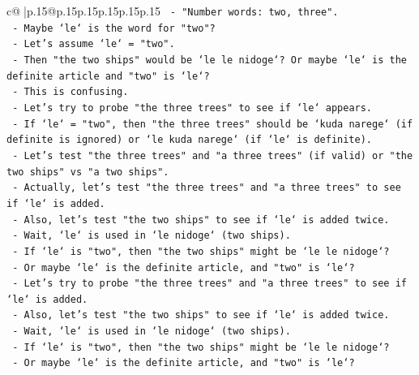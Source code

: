 \documentclass{article}
\begin{document}
{\begin{supertabular}{c@{$\;$}|p{.15\linewidth}@{}p{.15\linewidth}p{.15\linewidth}p{.15\linewidth}p{.15\linewidth}p{.15\linewidth}}
{{{\texttt{                           {-} "Number words: two, three".} \\
\texttt{                           {-} Maybe `le` is the word for "two"?} \\
\texttt{                           {-} Let's assume `le` = "two".} \\
\texttt{                           {-} Then "the two ships" would be `le le nidoge`? Or maybe `le` is the definite article and "two" is `le`?} \\
\texttt{                           {-} This is confusing.} \\
\texttt{                           {-} Let's try to probe "the three trees" to see if `le` appears.} \\
\texttt{                           {-} If `le` = "two", then "the three trees" should be `kuda narege` (if definite is ignored) or `le kuda narege` (if `le` is definite).} \\
\texttt{                           {-} Let's test "the three trees" and "a three trees" (if valid) or "the two ships" vs "a two ships".} \\
\texttt{                           {-} Actually, let's test "the three trees" and "a three trees" to see if `le` is added.} \\
\texttt{                           {-} Also, let's test "the two ships" to see if `le` is added twice.} \\
\texttt{                           {-} Wait, `le` is used in `le nidoge` (two ships).} \\
\texttt{                           {-} If `le` is "two", then "the two ships" might be `le le nidoge`?} \\
\texttt{                           {-} Or maybe `le` is the definite article, and "two" is `le`?} \\
\texttt{                           {-} Let's try to probe "the three trees" and "a three trees" to see if `le` is added.} \\
\texttt{                           {-} Also, let's test "the two ships" to see if `le` is added twice.} \\
\texttt{                           {-} Wait, `le` is used in `le nidoge` (two ships).} \\
\texttt{                           {-} If `le` is "two", then "the two ships" might be `le le nidoge`?} \\
\texttt{                           {-} Or maybe `le` is the definite article, and "two" is `le`?} \\
}}}
\end{supertabular}}
\end{document}
